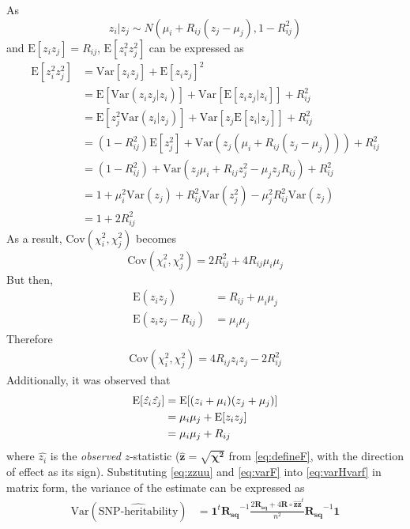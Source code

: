 \documentclass[12pt]{scrbook}
\begin{document}
As 
$$
z_i|z_j\sim N(\mu_i+R_{ij}(z_j-\mu_j),1-R_{ij}^2)
$$
and $\mathrm{E}[z_iz_j]=R_{ij}$, $\mathrm{E}[z_i^2z_j^2]$ can be expressed as
\begin{align*}
\mathrm{E}[z_i^2z_j^2]&=\mathrm{Var}[z_iz_j]+\mathrm{E}[z_iz_j]^2\\
&=\mathrm{E}[\mathrm{Var}(z_iz_j|z_i)]+\mathrm{Var}[\mathrm{E}[z_iz_j|z_i]]+R_{ij}^2\\
&=\mathrm{E}[z_j^2\mathrm{Var}(z_i|z_j)]+\mathrm{Var}[z_j\mathrm{E}[z_i|z_j]]+R_{ij}^2\\
&=(1-R_{ij}^2)\mathrm{E}[z_j^2]+\mathrm{Var}(z_j(\mu_i+R_{ij}(z_j-\mu_j)))+R_{ij}^2\\
&=(1-R_{ij}^2)+\mathrm{Var}(z_j\mu_i+R_{ij}z_j^2-\mu_jz_jR_{ij})+R_{ij}^2\\
&=1+\mu_i^2\mathrm{Var}(z_j)+R_{ij}^2\mathrm{Var}(z_j^2)-\mu_j^2R_{ij}^2\mathrm{Var}(z_j)\\
&=1+2R_{ij}^2
\end{align*}
As a result, $\mathrm{Cov}(\chi_i^2, \chi_j^2)$ becomes
\begin{equation}
\mathrm{Cov}(\chi_i^2,\chi_j^2) = 2R_{ij}^2+4R_{ij}\mu_i\mu_j
\label{eq:finalChi}
\end{equation}
But then, 
\begin{align}
\mathrm{E}(z_iz_j) &= R_{ij}+\mu_i\mu_j \nonumber \\
\mathrm{E}(z_iz_j-R_{ij})&=\mu_i\mu_j
\end{align}
Therefore
\begin{align}
\mathrm{Cov}(\chi_i^2, \chi_j^2)=4R_{ij}z_iz_j-2R_{ij}^2
\label{eq:varF}
\end{align}
Additionally, it was observed that
\begin{align}
\mathrm{E}[\hat{z_i}\hat{z_j}]&=\mathrm{E}[(z_i+\mu_i)(z_j+\mu_j)]\notag\\
&=\mu_i\mu_j+\mathrm{E}[z_iz_j]\nonumber\\
&=\mu_i\mu_j+R_{ij}
\label{eq:zzuu}
\end{align}
where $\hat{z_i}$ is the \emph{observed} $z$-statistic ($\boldsymbol{\hat{z}} = \sqrt{\boldsymbol{\chi^2}}$ from \cref{eq:defineF}, with the direction of effect as its sign).
Substituting \cref{eq:zzuu} and \cref{eq:varF} into \cref{eq:varHvarf} in matrix form, the variance of the estimate can be expressed as
\begin{align}
\mathrm{Var}(\hat{\text{SNP-heritability}}) &=\boldsymbol{1}^t\boldsymbol{R_{sq}}^{-1}\frac{2\boldsymbol{R_{sq}}+4\boldsymbol{R}\circ \boldsymbol{\hat{z}\hat{z}}^t}{n^2}\boldsymbol{R_{sq}}^{-1}\boldsymbol{1}
\label{eq:covH}
\end{align}
\end{document}
